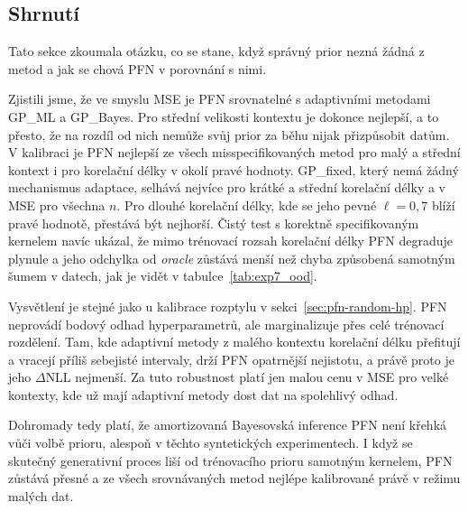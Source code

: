 \FloatBarrier

\subsection{Shrnutí}
\label{subsec:exp7-shrnuti}

Tato sekce zkoumala otázku, co se stane, když správný prior nezná žádná z metod a jak se chová PFN v porovnání s nimi.
\par

Zjistili jsme, že ve smyslu MSE je PFN srovnatelné s adaptivními metodami GP\_ML a GP\_Bayes.
Pro střední velikosti kontextu je dokonce nejlepší, a to přesto, že na rozdíl od nich nemůže svůj prior za běhu nijak přizpůsobit datům.
V kalibraci je PFN nejlepší ze všech misspecifikovaných metod pro malý a střední kontext i pro korelační délky v okolí pravé hodnoty.
GP\_fixed, který nemá žádný mechanismus adaptace, selhává nejvíce pro krátké a střední korelační délky a v MSE pro všechna $n$.
Pro dlouhé korelační délky, kde se jeho pevné $\ell = 0{,}7$ blíží pravé hodnotě, přestává být nejhorší.
Čistý test s korektně specifikovaným kernelem navíc ukázal, že mimo trénovací rozsah korelační délky PFN degraduje plynule a jeho odchylka od \emph{oracle} zůstává menší než chyba způsobená samotným šumem v datech, jak je vidět v tabulce~\ref{tab:exp7_ood}.
\par

Vysvětlení je stejné jako u kalibrace rozptylu v sekci~\ref{sec:pfn-random-hp}.
PFN neprovádí bodový odhad hyperparametrů, ale marginalizuje přes celé trénovací rozdělení.
Tam, kde adaptivní metody z malého kontextu korelační délku přefitují a vracejí příliš sebejisté intervaly, drží PFN opatrnější nejistotu, a právě proto je jeho $\Delta$NLL nejmenší.
Za tuto robustnost platí jen malou cenu v MSE pro velké kontexty, kde už mají adaptivní metody dost dat na spolehlivý odhad.
\par

Dohromady tedy platí, že amortizovaná Bayesovská inference PFN není křehká vůči volbě prioru, alespoň v těchto syntetických experimentech.
I když se skutečný generativní proces liší od trénovacího prioru samotným kernelem, PFN zůstává přesné a ze všech srovnávaných metod nejlépe kalibrované právě v režimu malých dat.
